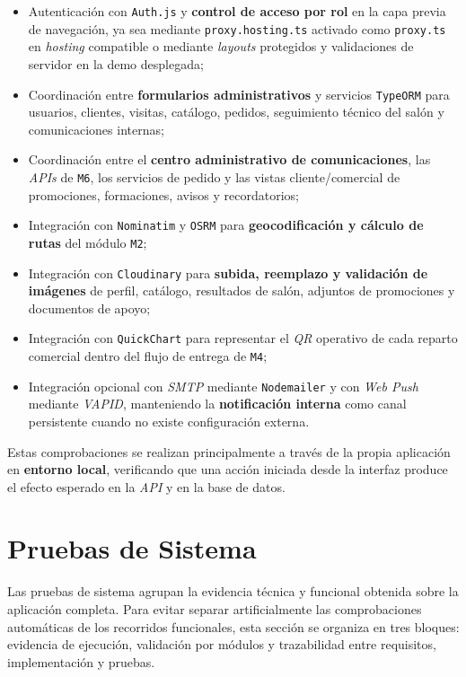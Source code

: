 \begin{itemize}
    \item Autenticación con \texttt{Auth.js} y \textbf{control de acceso por rol} en la capa previa de navegación, ya sea mediante \texttt{proxy.hosting.ts} activado como \texttt{proxy.ts} en \textit{hosting} compatible o mediante \textit{layouts} protegidos y validaciones de servidor en la demo desplegada;
    \item Coordinación entre \textbf{formularios administrativos} y servicios \texttt{TypeORM} para usuarios, clientes, visitas, catálogo, pedidos, seguimiento técnico del salón y comunicaciones internas;
    \item Coordinación entre el \textbf{centro administrativo de comunicaciones}, las \textit{APIs} de \texttt{M6}, los servicios de pedido y las vistas cliente/comercial de promociones, formaciones, avisos y recordatorios;
    \item Integración con \texttt{Nominatim} y \texttt{OSRM} para \textbf{geocodificación y cálculo de rutas} del módulo \texttt{M2};
    \item Integración con \texttt{Cloudinary} para \textbf{subida, reemplazo y validación de imágenes} de perfil, catálogo, resultados de salón, adjuntos de promociones y documentos de apoyo;
    \item Integración con \texttt{QuickChart} para representar el \textit{QR} operativo de cada reparto comercial dentro del flujo de entrega de \texttt{M4};
    \item Integración opcional con \textit{SMTP} mediante \texttt{Nodemailer} y con \textit{Web Push} mediante \textit{VAPID}, manteniendo la \textbf{notificación interna} como canal persistente cuando no existe configuración externa.
\end{itemize}

Estas comprobaciones se realizan principalmente a través de la propia aplicación en \textbf{entorno local}, verificando que una acción iniciada desde la interfaz produce el efecto esperado en la \textit{API} y en la base de datos.

\section{Pruebas de Sistema}

Las pruebas de sistema agrupan la evidencia técnica y funcional obtenida sobre la aplicación completa. Para evitar separar artificialmente las comprobaciones automáticas de los recorridos funcionales, esta sección se organiza en tres bloques: evidencia de ejecución, validación por módulos y trazabilidad entre requisitos, implementación y pruebas.

